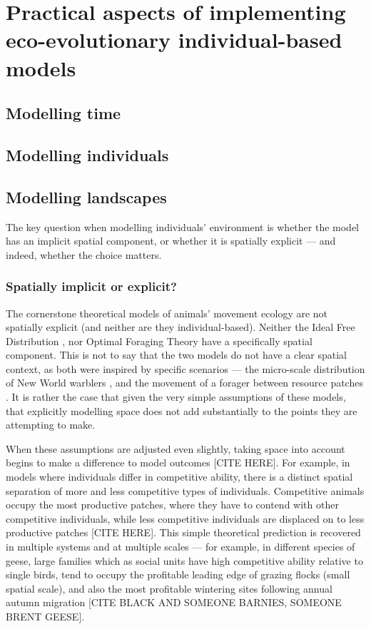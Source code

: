 \section*{Practical aspects of implementing eco-evolutionary individual-based models}

\subsection*{Modelling time}

\subsection*{Modelling individuals}

\subsection*{Modelling landscapes}

The key question when modelling individuals' environment is whether the model has an implicit spatial component, or whether it is spatially explicit --- and indeed, whether the choice matters.

\subsubsection*{Spatially implicit or explicit?}

The cornerstone theoretical models of animals' movement ecology are not spatially explicit (and neither are they individual-based).
Neither the Ideal Free Distribution \citep{fretwell1970}, nor Optimal Foraging Theory \citep{charnov1976} have a specifically spatial component.
This is not to say that the two models do not have a clear spatial context, as both were inspired by specific scenarios --- the micro-scale distribution of New World warblers \citep[IFD:][]{fretwell1970}, and the movement of a forager between resource patches \citep{charnov1976}.
It is rather the case that given the very simple assumptions of these models, that explicitly modelling space does not add substantially to the points they are attempting to make.

When these assumptions are adjusted even slightly, taking space into account begins to make a difference to model outcomes [CITE HERE].
For example, in models where individuals differ in competitive ability, there is a distinct spatial separation of more and less competitive types of individuals.
Competitive animals occupy the most productive patches, where they have to contend with other competitive individuals, while less competitive individuals are displaced on to less productive patches [CITE HERE].
This simple theoretical prediction is recovered in multiple systems and at multiple scales --- for example, in different species of geese, large families which as social units have high competitive ability relative to single birds, tend to occupy the profitable leading edge of grazing flocks (small spatial scale), and also the most profitable wintering sites following annual autumn migration [CITE BLACK AND SOMEONE BARNIES, SOMEONE BRENT GEESE].

